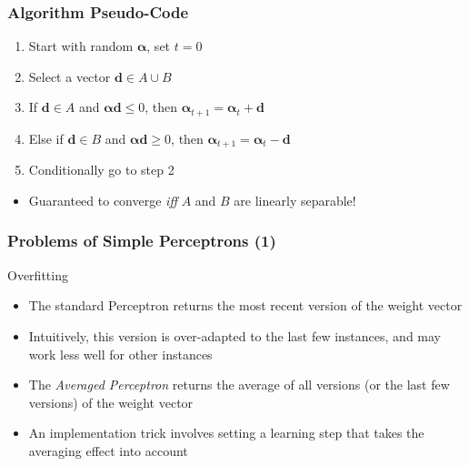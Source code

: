 \documentclass{beamer}
\begin{document}
\begin{frame} \frametitle{Algorithm Pseudo-Code}
    \begin{enumerate}
    \item Start with random $\mathbf \alpha$, set $t = 0$
    \item Select a vector $\mathbf d \in A \cup B$
    \item If $\mathbf d \in A$ and $\mathbf \alpha \mathbf d \leq 0$, then $\mathbf \alpha_{t+1} = \mathbf \alpha_t + \mathbf d$
    \item Else if $\mathbf d \in B$ and $\mathbf \alpha \mathbf d \geq 0$, then $\mathbf \alpha_{t+1} = \mathbf \alpha_t - \mathbf d$    
    \item Conditionally go to step 2
    \end{enumerate}
    \begin{itemize}
    \item Guaranteed to converge \emph{iff} $A$ and $B$ are linearly separable!
    \end{itemize}
\end{frame}

\begin{frame} \frametitle{Problems of Simple Perceptrons (1)}
\begin{block}{Overfitting}
\begin{itemize}
\item The standard Perceptron returns the most recent version of the weight vector
\item Intuitively, this version is over-adapted to the last few instances, and may work less well for other instances
\end{itemize}
\end{block}
\begin{block}{}
\begin{itemize}
\item The \emph{Averaged Perceptron} returns the average of all versions (or the last few versions) of the weight vector
\item An implementation trick involves setting a learning step that takes the averaging effect into account
\end{itemize}
\end{block}
\end{frame}
\end{document}
